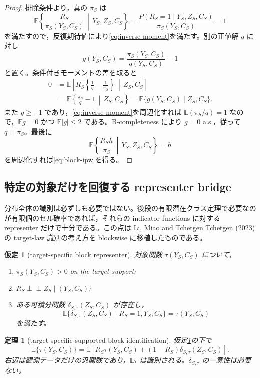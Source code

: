\documentclass[11pt,a4paper]{ltjsarticle}
\newtheorem{assumption}{仮定}[section]
\newtheorem{theorem}{定理}[section]
\theoremstyle{remark}\newtheorem{remark}{注意}[section]
\newcommand{\E}{\mathbb E}
\newcommand{\ind}{\perp\!\!\!\perp}
\newcommand{\given}{\,\middle|\,}
\begin{document}
\begin{proof}
排除条件より，真の $\pi_S$ は
\[
\E\left\{\frac{R_S}{\pi_S(Y_S,C_S)}\given Y_S,Z_S,C_S\right\}
=\frac{P(R_S=1\mid Y_S,Z_S,C_S)}{\pi_S(Y_S,C_S)}=1
\]
を満たすので，反復期待値により\eqref{eq:inverse-moment}を満たす。別の正値解 $q$ に対し
\[
g(Y_S,C_S)=\frac{\pi_S(Y_S,C_S)}{q(Y_S,C_S)}-1
\]
と置く。条件付きモーメントの差を取ると
\begin{align*}
0
&=\E\left[R_S\left\{\frac1q-\frac1{\pi_S}\right\}\given Z_S,C_S\right]\\
&=\E\left\{\frac{\pi_S}{q}-1\given Z_S,C_S\right\}
=\E\{g(Y_S,C_S)\mid Z_S,C_S\}.
\end{align*}
また $g\ge-1$ であり，\eqref{eq:inverse-moment}を周辺化すれば $\E(\pi_S/q)=1$ なので，$\E g=0$ かつ $\E|g|\le2$ である。B-completeness により $g=0$ a.s.，従って $q=\pi_S$。最後に
\[
\E\left\{\frac{R_Sh}{\pi_S}\given Y_S,Z_S,C_S\right\}=h
\]
を周辺化すれば\eqref{eq:block-ipw}を得る。
\end{proof}

\subsection{特定の対象だけを回復する representer bridge}
分布全体の識別は必ずしも必要ではない。後段の有限潜在クラス定理で必要なのが有限個のセル確率であれば，それらの indicator functions に対する representer だけで十分である。この点は Li, Miao and Tchetgen Tchetgen (2023) の target-law 識別の考え方を blockwise に移植したものである。

\begin{assumption}[target-specific block representer]\label{as:targetbridge}
対象関数 $\tau(Y_S,C_S)$ について，
\begin{enumerate}[label=(R\arabic*)]
\item $\pi_S(Y_S,C_S)>0$ on the target support;
\item $R_S\ind Z_S\mid(Y_S,C_S)$;
\item ある可積分関数 $\delta_{S,\tau}(Z_S,C_S)$ が存在し，
\begin{equation}
\E\{\delta_{S,\tau}(Z_S,C_S)\mid R_S=1,Y_S,C_S\}
=\tau(Y_S,C_S)\label{eq:repr-bridge}
\end{equation}
を満たす。
\end{enumerate}
\end{assumption}

\begin{theorem}[target-specific supported-block identification]\label{thm:targetbridge}
仮定\ref{as:targetbridge}の下で
\begin{equation}
\E\{\tau(Y_S,C_S)\}
=
\E\left[
R_S\tau(Y_S,C_S)+(1-R_S)\delta_{S,\tau}(Z_S,C_S)
\right].\label{eq:target-id}
\end{equation}
右辺は観測データだけの汎関数であり，$\E\tau$ は識別される。$\delta_{S,\tau}$ の一意性は必要ない。
\end{theorem}
\end{document}

